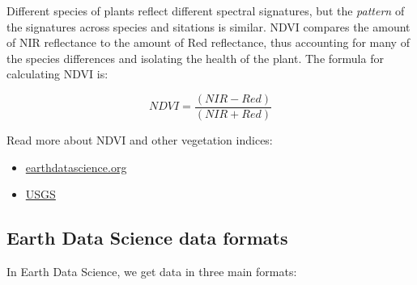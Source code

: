 \documentclass[
  letterpaper,
  DIV=11,
  numbers=noendperiod,
  oneside]{scrreprt}
\providecommand{\tightlist}{%
  \setlength{\itemsep}{0pt}\setlength{\parskip}{0pt}}
\begin{document}
Different species of plants reflect different spectral signatures, but
the \emph{pattern} of the signatures across species and sitations is
similar. NDVI compares the amount of NIR reflectance to the amount of
Red reflectance, thus accounting for many of the species differences and
isolating the health of the plant. The formula for calculating NDVI is:

\[NDVI = \frac{(NIR - Red)}{(NIR + Red)}\]

\begin{tcolorbox}[enhanced jigsaw, colbacktitle=quarto-callout-color!10!white, opacityback=0, bottomtitle=1mm, toptitle=1mm, bottomrule=.15mm, left=2mm, colframe=quarto-callout-color-frame, leftrule=.75mm, opacitybacktitle=0.6, colback=white, rightrule=.15mm, toprule=.15mm, breakable, titlerule=0mm, title=\textcolor{quarto-callout-color}{\faInfo}\hspace{0.5em}{Read More}, coltitle=black, arc=.35mm]

Read more about NDVI and other vegetation indices:

\begin{itemize}
\tightlist
\item
  \href{https://www.earthdatascience.org/courses/use-data-open-source-python/multispectral-remote-sensing/vegetation-indices-in-python/calculate-NDVI-python/}{earthdatascience.org}
\item
  \href{https://www.usgs.gov/landsat-missions/landsat-surface-reflectance-derived-spectral-indices}{USGS}
\end{itemize}

\end{tcolorbox}

\subsection{Earth Data Science data
formats}\label{earth-data-science-data-formats}

In Earth Data Science, we get data in three main formats:
\end{document}
